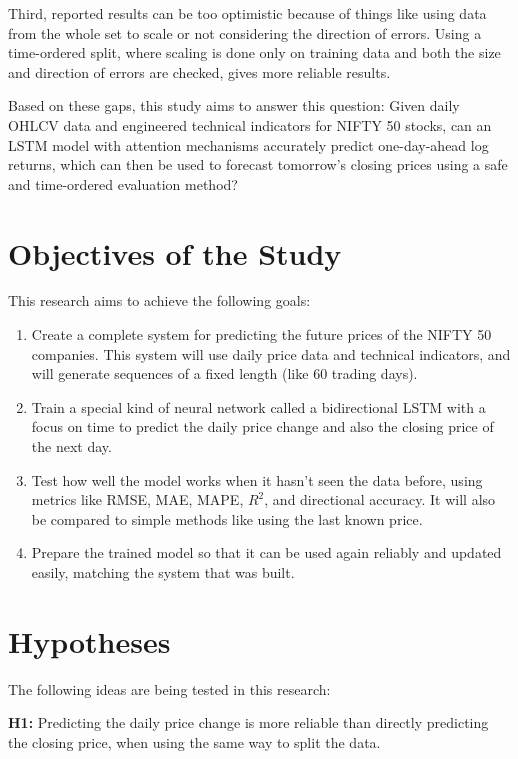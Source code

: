 \documentclass[conference]{IEEEtran}
\begin{document}
Third, reported results can be too optimistic because of things like using data from the whole set to scale or not considering the direction of errors. Using a time-ordered split, where scaling is done only on training data and both the size and direction of errors are checked, gives more reliable results.

Based on these gaps, this study aims to answer this question: Given daily OHLCV data and engineered technical indicators for NIFTY 50 stocks, can an LSTM model with attention mechanisms accurately predict one-day-ahead log returns, which can then be used to forecast tomorrow’s closing prices using a safe and time-ordered evaluation method?

\section{Objectives of the Study}

This research aims to achieve the following goals:

\begin{enumerate}
\item Create a complete system for predicting the future prices of the NIFTY 50 companies. This system will use daily price data and technical indicators, and will generate sequences of a fixed length (like 60 trading days).
\item Train a special kind of neural network called a bidirectional LSTM with a focus on time to predict the daily price change and also the closing price of the next day.
\item Test how well the model works when it hasn’t seen the data before, using metrics like RMSE, MAE, MAPE, $R^2$, and directional accuracy. It will also be compared to simple methods like using the last known price.
\item Prepare the trained model so that it can be used again reliably and updated easily, matching the system that was built.
\end{enumerate}

\section{Hypotheses}

The following ideas are being tested in this research:

\textbf{H1:} Predicting the daily price change is more reliable than directly predicting the closing price, when using the same way to split the data.
\end{document}
